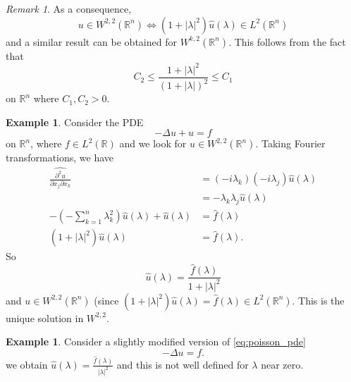 \documentclass[10pt, oneside, reqno]{amsart}
\theoremstyle{plain}%
\numberwithin{equation}{section}
\theoremstyle{definition}
\newtheorem{exmp}[thm]{Example}
\theoremstyle{remark}
\newtheorem*{rem}{Remark}
\newcommand{\R}{\mathbb{R}}
\begin{document}
\begin{rem}
	As a consequence, \[
		u \in W^{2, 2}(\R^n) \iff \left(1 + |\lambda|^2 \right) \hat u(\lambda) \in L^2(\R^n)
	\] and a similar result can be obtained for $W^{k, 2}(\R^n)$.  This follows from the fact that \[
		C_2 \leq \frac{1 + |\lambda|^2}{(1 + |\lambda|)^2} \leq C_1
	\] on $\R^n$ where $C_1, C_2 > 0$.
\end{rem}

\begin{exmp}
	Consider the PDE \begin{equation}
		\label{eq:poisson_pde}
		-\Delta u + u = f
	\end{equation}
	on $\R^n$, where $f \in L^2(\R)$ and we look for $u \in W^{2, 2}(\R^n)$.  Taking Fourier transformations, we have \begin{align*}
		\hat{\frac{\partial^2 u}{\partial x_j \partial x_k}} &= (-i \lambda_k)(-i\lambda_j) \hat u(\lambda) \\
		&= - \lambda_k \lambda_j \hat u(\lambda) \\
		- \left(-\sum_{k=1}^n \lambda_k^2 \right) \hat u(\lambda) + \hat u(\lambda) &= \hat f(\lambda) \\
		\left(1 + |\lambda|^2 \right) \hat u(\lambda) &= \hat f(\lambda). 
	\end{align*}  So \[
		\hat u(\lambda) = \frac{\hat f(\lambda)}{1 + |\lambda|^2}
	\] and $u \in W^{2, 2}(\R^n)$ (since $\left(1 + |\lambda|^2\right) \hat u (\lambda) = \hat f(\lambda) \in L^2(\R^n)$.  This is the unique solution in $W^{2, 2}$.
\end{exmp}


\begin{exmp}
	Consider a slightly modified version of \eqref{eq:poisson_pde} \[
		-\Delta u = f. 
	\] we obtain $\hat u (\lambda) = \frac{\hat f(\lambda)}{|\lambda|^2}$ and this is not well defined for $\lambda$ near zero.
\end{exmp}
\end{document}
